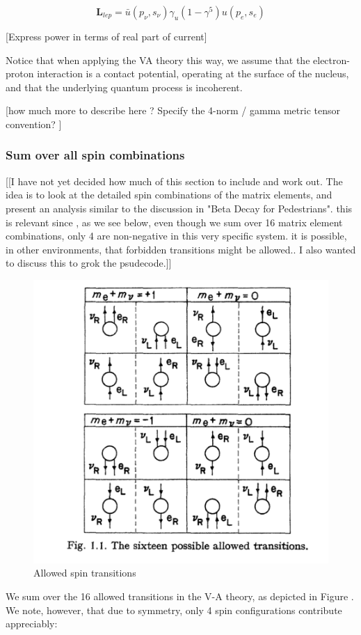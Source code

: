 \documentclass[%
 aip,
 jmp,%
 amsmath,amssymb,
 reprint,%
]{revtex4-1}
\begin{document}
$$\mathbf{L}_{lep}=\bar{u}(p_{\nu},s_{\nu})\gamma_{u}(1-\gamma^{5})u(p_{e},s_{e})$$

[Express power in terms of real part of current]

Notice that when applying the VA theory this way, we assume that the electron-proton interaction is a contact potential, operating at the surface of the nucleus, and that the underlying quantum process is incoherent.  

[how much more to describe here ?  Specify the 4-norm / gamma metric tensor convention? ]


\subsubsection{Sum over all spin combinations}

[[I have not yet decided how much of this section to include and work out.  The idea is to look at the detailed spin combinations of the matrix elements, and present an analysis similar to the discussion in "Beta Decay for Pedestrians".  this is relevant since , as we see below, even though we sum over 16 matrix element combinations, only 4 are non-negative in this very specific system.  it is possible, in other environments, that forbidden transitions might be allowed.. I also wanted to discuss this to grok the psudecode.]]  


\begin{figure}
   \includegraphics[scale=0.5]{img/16-allowed.png}
   \caption{Allowed spin transitions}
  \label{fig:SC}
\end{figure}
We sum over the 16  allowed transitions in the V-A theory, as depicted in Figure \cite{fig:SC}.
We note, however, that due to symmetry, only 4 spin configurations contribute appreciably:
\end{document}
